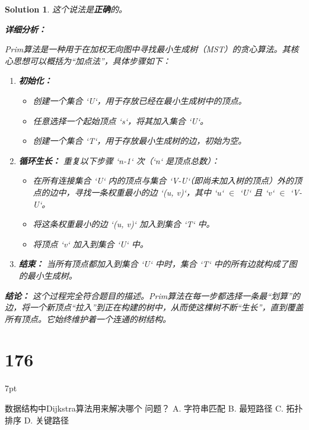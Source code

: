 \documentclass[UTF8]{report}
\newtheorem{solution}{Solution}
\theoremstyle{MyLineTheoremStyle} %
\theoremstyle{MyBlockTheoremStyle} %
\theoremstyle{MySubsubsectionStyle} %
\newenvironment{graybox}{%
        \def\FrameCommand{%
        \hspace{1pt}%
        {\color{gray}\small \vrule width 2pt}%
        {\color{graybox_color}\vrule width 4pt}%
        \colorbox{graybox_color}%
        }%
        \MakeFramed{\advance\hsize-\width\FrameRestore}%
        \noindent\hspace{-4.55pt}%
        \begin{adjustwidth}{}{7pt}%
        \vspace{2pt}\vspace{2pt}%
        }
        {%
        \vspace{2pt}\end{adjustwidth}\endMakeFramed%
        }
\begin{document}
\begin{solution}
这个说法是\textbf{正确}的。

\textbf{详细分析：}

Prim算法是一种用于在加权无向图中寻找最小生成树（MST）的贪心算法。其核心思想可以概括为“加点法”，具体步骤如下：

\begin{enumerate}
    \item \textbf{初始化：}
    \begin{itemize}
        \item 创建一个集合 `U`，用于存放已经在最小生成树中的顶点。
        \item 任意选择一个起始顶点 `s`，将其加入集合 `U`。
        \item 创建一个集合 `T`，用于存放最小生成树的边，初始为空。
    \end{itemize}

    \item \textbf{循环生长：}
    重复以下步骤 `n-1` 次（`n` 是顶点总数）：
    \begin{itemize}
        \item 在所有连接集合 `U` 内的顶点与集合 `V-U`（即尚未加入树的顶点）外的顶点的边中，寻找一条权重最小的边 `(u, v)`，其中 `u` $\in$ `U` 且 `v` $\in$ `V-U`。
        \item 将这条权重最小的边 `(u, v)` 加入到集合 `T` 中。
        \item 将顶点 `v` 加入到集合 `U` 中。
    \end{itemize}

    \item \textbf{结束：}
    当所有顶点都加入到集合 `U` 中时，集合 `T` 中的所有边就构成了图的最小生成树。
\end{enumerate}

\textbf{结论：}
这个过程完全符合题目的描述。Prim算法在每一步都选择一条最“划算”的边，将一个新顶点“拉入”到正在构建的树中，从而使这棵树不断“生长”，直到覆盖所有顶点。它始终维护着一个连通的树结构。
\end{solution}


\section*{176}
\begin{graybox}
数据结构中Dijkstra算法用来解决哪个
问题？
A. 字符串匹配
B. 最短路径
C. 拓扑排序
D. 关键路径
\end{graybox}
\end{document}
